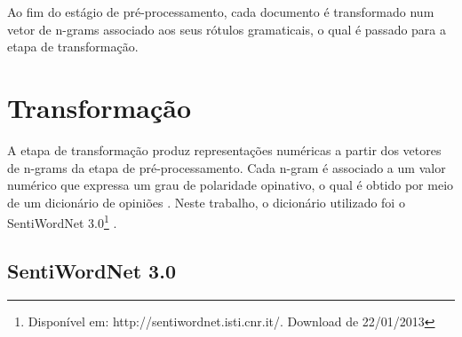 \documentclass[template.tex]{subfiles}
\begin{document}
Ao fim do estágio de pré-processamento, cada documento é transformado num vetor de n-grams associado aos seus rótulos gramaticais, o qual é passado para a etapa de transformação.  

\section{Transformação}


A etapa de transformação produz representações numéricas a partir dos vetores de n-grams da etapa de pré-processamento. Cada n-gram é associado a um valor numérico que expressa um grau de polaridade opinativo, o qual é obtido por meio de um dicionário de opiniões \cite{ballhysa2012fuzzy, moraes2012document, mouthami2013sentiment}. Neste trabalho, o dicionário utilizado foi o SentiWordNet 3.0\footnote{Disponível em: http://sentiwordnet.isti.cnr.it/. Download de 22/01/2013} \cite{baccianella2010sentiwordnet}.

\subsection{SentiWordNet 3.0}
\end{document}
